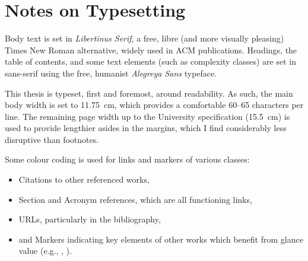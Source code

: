 \chapter*{Notes on Typesetting}

Body text is set in \emph{Libertinus Serif}, a free, libre (and more visually pleasing) Times New Roman alternative, widely used in ACM publications.
Headings, the table of contents, and some text elements (such as complexity classes) are set in sans-serif using the free, humanist \emph{Alegreya Sans} typeface.

This thesis is typeset, first and foremost, around readability.
As such, the main body width is set to \qty{11.75}{\centi\metre}, which provides a comfortable \numrange{60}{65} characters per line.
The remaining page width up to the University specification (\qty{15.5}{\centi\metre}) is used to provide lengthier asides in the margins, which I find considerably less disruptive than footnotes.

Some colour coding is used for links and markers of various classes:
\begin{itemize}
	\item {\color{kthesis-cite}Citations} to other referenced works,
	\item {\color{kthesis-internal}Section and Acronym} references, which are all functioning links,
	\item {\color{kthesis-url}URLs}, particularly in the bibliography,
	\item and {\color{kthesis-glance}Markers} indicating key elements of other works which benefit from glance value (e.g., \rllitstate, \rllitact).
\end{itemize}
